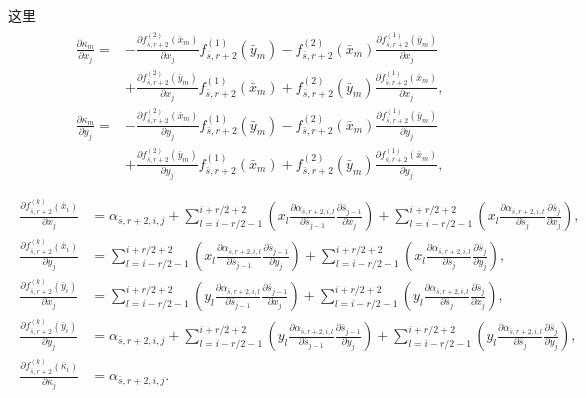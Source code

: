 \documentclass[a4paper,twoside]{ctexart}
\newcommand{\pdfrac}[2]{\frac{\partial #1}{\partial #2}}
\begin{document}
这里
\begin{eqnarray}
  \label{eq:showcalintails1}
  \begin{aligned}
    \pdfrac{\kappa_m}{x_j} =&
    -\pdfrac{f_{\bar{s},r+2}^{(2)}(\bar{x}_m)}{x_j}f_{\bar{s},r+2}^{(1)}(\bar{y}_m)-f_{\bar{s},r+2}^{(2)}(\bar{x}_m)\pdfrac{f_{\bar{s},r+2}^{(1)}(\bar{y}_m)}{x_j}\\
    &+\pdfrac{f_{\bar{s},r+2}^{(2)}(\bar{y}_m)}{x_j}f_{\bar{s},r+2}^{(1)}(\bar{x}_m)+f_{\bar{s},r+2}^{(2)}(\bar{y}_m)\pdfrac{f_{\bar{s},r+2}^{(1)}(\bar{x}_m)}{x_j},\\
    \pdfrac{\kappa_m}{y_j} =&
    -\pdfrac{f_{\bar{s},r+2}^{(2)}(\bar{x}_m)}{y_j}f_{\bar{s},r+2}^{(1)}(\bar{y}_m)-f_{\bar{s},r+2}^{(2)}(\bar{x}_m)\pdfrac{f_{\bar{s},r+2}^{(1)}(\bar{y}_m)}{y_j}\\
    &+\pdfrac{f_{\bar{s},r+2}^{(2)}(\bar{y}_m)}{y_j}f_{\bar{s},r+2}^{(1)}(\bar{x}_m)+f_{\bar{s},r+2}^{(2)}(\bar{y}_m)\pdfrac{f_{\bar{s},r+2}^{(1)}(\bar{x}_m)}{y_j},\\
  \end{aligned}
\end{eqnarray}
\begin{eqnarray}
  \label{eq:showcalintails2}
  \begin{aligned}
    \pdfrac{f_{\bar{s},r+2}^{(k)}(\bar{x}_i)}{x_j} &=
    \alpha_{\bar{s},r+2,i,j} +
    \sum_{l=i-r/2-1}^{i+r/2+2}(x_l\pdfrac{\alpha_{\bar{s},r+2,i,l}}{\bar{s}_{j-1}}\pdfrac{\bar{s}_{j-1}}{x_j})
    +
    \sum_{l=i-r/2-1}^{i+r/2+2}(x_l\pdfrac{\alpha_{\bar{s},r+2,i,l}}{\bar{s}_{j}}\pdfrac{\bar{s}_{j}}{x_j}),\\
    \pdfrac{f_{\bar{s},r+2}^{(k)}(\bar{x}_i)}{y_j} &=
    \sum_{l=i-r/2-1}^{i+r/2+2}(x_l\pdfrac{\alpha_{\bar{s},r+2,i,l}}{\bar{s}_{j-1}}\pdfrac{\bar{s}_{j-1}}{y_j})
    +
    \sum_{l=i-r/2-1}^{i+r/2+2}(x_l\pdfrac{\alpha_{\bar{s},r+2,i,l}}{\bar{s}_{j}}\pdfrac{\bar{s}_{j}}{y_j}),\\
    \pdfrac{f_{\bar{s},r+2}^{(k)}(\bar{y}_i)}{x_j} &=
    \sum_{l=i-r/2-1}^{i+r/2+2}(y_l\pdfrac{\alpha_{\bar{s},r+2,i,l}}{\bar{s}_{j-1}}\pdfrac{\bar{s}_{j-1}}{x_j})
    +
    \sum_{l=i-r/2-1}^{i+r/2+2}(y_l\pdfrac{\alpha_{\bar{s},r+2,i,l}}{\bar{s}_{j}}\pdfrac{\bar{s}_{j}}{x_j}),\\
    \pdfrac{f_{\bar{s},r+2}^{(k)}(\bar{y}_i)}{y_j} &=
    \alpha_{\bar{s},r+2,i,j} +
    \sum_{l=i-r/2-1}^{i+r/2+2}(y_l\pdfrac{\alpha_{\bar{s},r+2,i,l}}{\bar{s}_{j-1}}\pdfrac{\bar{s}_{j-1}}{y_j})
    +
    \sum_{l=i-r/2-1}^{i+r/2+2}(y_l\pdfrac{\alpha_{\bar{s},r+2,i,l}}{\bar{s}_{j}}\pdfrac{\bar{s}_{j}}{y_j}),\\
    \pdfrac{f_{\bar{s},r+2}^{(k)}(\bar{\kappa}_i)}{\kappa_j} &=
    \alpha_{\bar{s},r+2,i,j}
    .\\
  \end{aligned}
\end{eqnarray}
\end{document}
